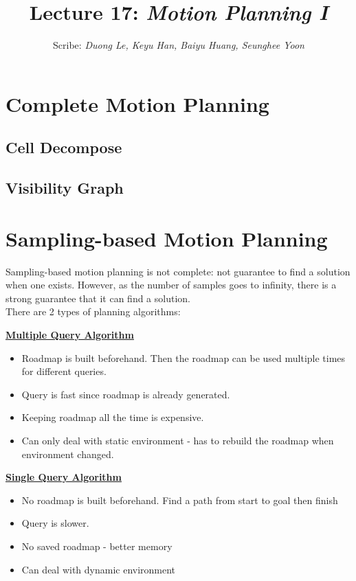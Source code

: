 \documentclass[11pt]{article}
\title{Lecture 17: \it{Motion Planning I}}
\author{Scribe:  \it{Duong Le, Keyu Han, Baiyu Huang, Seunghee Yoon}}
\date{}
\begin{document}
\maketitle
\thispagestyle{fancy}
\section{Complete Motion Planning}
\subsection{Cell Decompose}
\subsection{Visibility Graph}
\section{Sampling-based Motion Planning}
Sampling-based motion planning is not complete: not guarantee to find a solution when one exists. However, as the number of samples goes to infinity, there is a strong guarantee that it can find a solution.\\
There are 2 types of planning algorithms:\\
\begin{multicols*}{2}
\textbf{\underline{Multiple Query Algorithm}}
\begin{itemize}
\item Roadmap is built beforehand. Then the roadmap can be used multiple times for different queries.
\item Query is fast since roadmap is already generated.
\item Keeping roadmap all the time is expensive.
\item Can only deal with static environment - has to rebuild the roadmap when environment changed.
\end{itemize}
\vfill\null
\columnbreak
\textbf{\underline{Single Query Algorithm}}
\begin{itemize}
\item No roadmap is built beforehand. Find a path from start to goal then finish\\
\item Query is slower.\\
\item No saved roadmap - better memory \\
\item Can deal with dynamic environment 
\end{itemize}
\end{multicols*}
\end{document}
